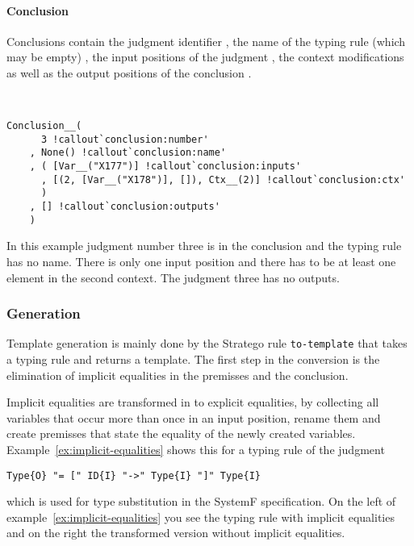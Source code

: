 \paragraph{Conclusion}
Conclusions contain the judgment identifier
, the name of the typing rule (which may
be empty) , the input positions of the
judgment , the context modifications
 as well as the output positions of the
conclusion .

\begin{example}{~}
\begin{verbatim}
Conclusion__(
      3 !callout`conclusion:number'
    , None() !callout`conclusion:name'
    , ( [Var__("X177")] !callout`conclusion:inputs'
      , [(2, [Var__("X178")], []), Ctx__(2)] !callout`conclusion:ctx'
      )
    , [] !callout`conclusion:outputs'
    )
\end{verbatim}
\end{example}

In this example judgment number three is in the conclusion and the
typing rule has no name. There is only one input position and there
has to be at least one element in the second context. The judgment
three has no outputs.

\subsubsection{Generation}
Template generation is mainly done by the Stratego rule
\verb|to-template| that takes a typing rule and returns a
template. The first step in the conversion is the elimination of
implicit equalities in the premisses and the conclusion.

Implicit equalities are transformed in to explicit equalities, by
collecting all variables that occur more than once in an input
position, rename them and create premisses that state the equality of
the newly created variables. Example~\ref{ex:implicit-equalities}
shows this for a typing rule of the judgment

\begin{verbatim}
Type{O} "= [" ID{I} "->" Type{I} "]" Type{I}
\end{verbatim}

which is used for type substitution in the SystemF specification. On
the left of example~\ref{ex:implicit-equalities} you see the typing
rule with implicit equalities and on the right the transformed version
without implicit equalities.

